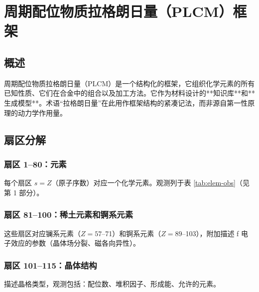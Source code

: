 \documentclass[12pt,a4paper]{article}
\begin{document}
\begin{landscape}
		\vspace{0.2cm}
		\noindent\makebox[\linewidth]{%
			\scalebox{0.75}{%
				$\displaystyle
				+
				\underbrace{\lambda_{131} L_{131}^{\text{CALPHAD}}}_{\text{CALPHAD 集成}}
				+
				\underbrace{\sum_{s=1}^{80} \kappa_{s,131}^{\text{el-CALPHAD}} \,\mathrm{Tr}(\Psi_{s,131} O_s^{\text{el}} O_{131}^{\text{CALPHAD}\dagger})}_{\text{元素–CALPHAD 耦合}}
				\Bigg]
				\times \prod_{i=1}^{155} \Theta(P_i - P_{i,\text{crit}})
				$
			}
		}
		\label{fig:full-lagrangian}
	\end{landscape}
	
	\section{周期配位物质拉格朗日量（PLCM）框架}
	
	\subsection{概述}
	
	周期配位物质拉格朗日量（PLCM）是一个结构化的框架，它组织化学元素的所有已知性质、它们在合金中的组合以及加工方法。它作为材料设计的**知识库**和**生成模型**。术语“拉格朗日量”在此用作框架结构的紧凑记法，而非源自第一性原理的动力学作用量。
	
	\subsection{扇区分解}
	
	\subsubsection{扇区 1–80：元素}
	每个扇区 \(s = Z\)（原子序数）对应一个化学元素。观测列于表 \ref{tab:elem-obs}（见第 1 部分）。
	
	\subsubsection{扇区 81–100：稀土元素和锕系元素}
	这些扇区对应镧系元素（\(Z=57\)–71）和锕系元素（\(Z=89\)–103），附加描述 f 电子效应的参数（晶体场分裂、磁各向异性）。
	
	\subsubsection{扇区 101–115：晶体结构}
	描述晶格类型，观测包括：配位数、堆积因子、形成能、允许的元素。
	
\end{document}
